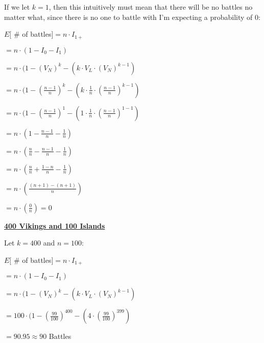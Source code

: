 \documentclass[12pt]{article}
\begin{document}
If we let $k=1$, then this intuitively must mean that there will be no battles no matter what, since there is no one to battle with I'm expecting a probability of $0$:

\begin{center}
$E[$ \# of battles$] = n \cdot I_{1+}$

$ = n \cdot (1 -  I_{0} -I_{1})$

$ = n \cdot (1 - (V_{N})^{k} - (k \cdot V_{L} \cdot (V_{N})^{k-1}) $

$ = n \cdot (1 - (\frac{n-1}{n})^{k} - (k \cdot \frac{1}{n} \cdot (\frac{n-1}{n})^{k-1})$

$ = n \cdot (1 - (\frac{n-1}{n})^{1} - (1 \cdot \frac{1}{n} \cdot (\frac{n-1}{n})^{1-1})$

$ = n \cdot (1 - \frac{n-1}{n} - \frac{1}{n})$

$ = n \cdot (\frac{n}{n} - \frac{n-1}{n} - \frac{1}{n})$

$ = n \cdot (\frac{n}{n} + \frac{1-n}{n} - \frac{1}{n})$

$ = n \cdot (\frac{(n+1)-(n+1)}{n})$

$ = n \cdot (\frac{0}{n}) = 0$


\end{center}

\textbf{\underline{400 Vikings and 100 Islands}}

Let $k=400$ and $n=100$:

\begin{center}

$E[$ \# of battles$] = n \cdot I_{1+}$

$ = n \cdot (1 -  I_{0} -I_{1})$

$ = n \cdot (1 - (V_{N})^{k} - (k \cdot V_{L} \cdot (V_{N})^{k-1}) $

$ = 100 \cdot (1 - (\frac{99}{100})^{400} - (4 \cdot (\frac{99}{100})^{399})$

$ = 90.95 \approx 90$ Battles

\end{center}
\end{document}

